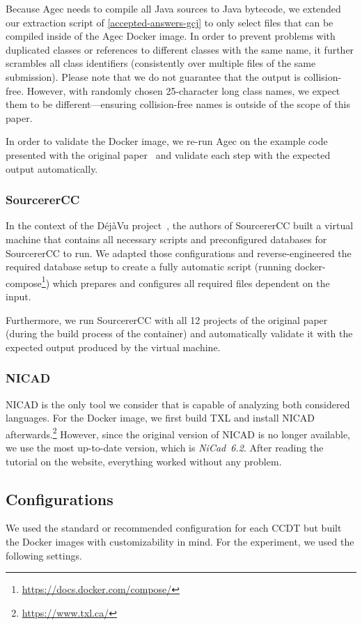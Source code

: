 \documentclass[10pt,journal,compsoc]{IEEEtran}
\def\todo#1{\textcolor{brown!80!yellow!70!black!90!red}{[\textsc{todo}: \textsf{#1}]}}
\newcommand*\urldate[2]{\url{#1}\;\textsuperscript{\color{gray}\DTMdate{#2}}}
\newcommand*\footurl[3][]{\footnote{#1\urldate{#2}{#3}}}
\begin{document}
Because Agec needs to compile all Java sources to Java bytecode, we extended our extraction script of \cref{accepted-answers-gcj} to only select files that can be compiled inside of the Agec Docker image. In order to prevent problems with duplicated classes or references to different classes with the same name, it further scrambles all class identifiers (consistently over multiple files of the same submission).
Please note that we do not guarantee that the output is collision-free. However, with randomly chosen 25-character long class names, we expect them to be different---ensuring collision-free names is outside of the scope of this paper.

In order to validate the Docker image, we re-run Agec on the example code presented with the original paper~\cite{6613854} and validate each step with the expected output automatically.

\subsubsection{SourcererCC}
In the context of the DéjàVu project~\cite{10.1145/3133908}, the authors of SourcererCC built a virtual machine that contains all necessary scripts and preconfigured databases for SourcererCC to run.
We adapted those configurations and reverse-engineered the required database setup to create a fully automatic script (running docker-compose\footurl{https://docs.docker.com/compose/}{2022-03-01}) which prepares and configures all required files dependent on the input.

Furthermore, we run SourcererCC with all 12 projects of the original paper (during the build process of the container) and automatically validate it with the expected output produced by the virtual machine.

\subsubsection{NICAD}
NICAD is the only tool we consider that is capable of analyzing both considered languages.
For the Docker image, we first build TXL and install NICAD afterwards.\footurl{https://www.txl.ca/}{2022-03-01}
However, since the original version of NICAD is no longer available, we use the most up-to-date version, which is \mbox{\textit{NiCad~6.2}}. After reading the tutorial on the website, everything worked without any problem.

\subsection{Configurations}\label{configuration}
We used the standard or recommended configuration for each CCDT but built the Docker images with customizability in mind. For the experiment, we used the following settings.
\end{document}

